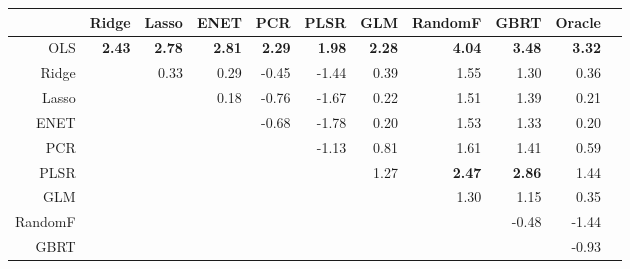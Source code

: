 \documentclass{article}
\begin{document}
\begin{table}[ht]
\centering
\begin{tabular}{rrrrrrrrrrr}
  \hline
& Ridge & Lasso & ENET & PCR & PLSR & GLM & RandomF & GBRT & Oracle \\ 
  \hline
OLS & \textbf{2.43} & \textbf{2.78} & \textbf{2.81} & \textbf{2.29} & \textbf{1.98} & \textbf{2.28} & \textbf{4.04} & \textbf{3.48} & \textbf{3.32} \\ 
  Ridge  && 0.33 & 0.29 & -0.45 & -1.44 & 0.39 & 1.55 & 1.30 & 0.36 \\ 
  Lasso  &&& 0.18 & -0.76 & -1.67 & 0.22 & 1.51 & 1.39 & 0.21 \\ 
  ENET  &&&& -0.68 & -1.78 & 0.20 & 1.53 & 1.33 & 0.20 \\ 
  PCR  &&&&& -1.13 & 0.81 & 1.61 & 1.41 & 0.59 \\ 
  PLSR  &&&&&& 1.27 & \textbf{2.47} & \textbf{2.86} & 1.44 \\ 
  GLM  &&&&&&& 1.30 & 1.15 & 0.35 \\ 
  RandomF &&&&&&&& -0.48 & -1.44 \\ 
  GBRT  &&&&&&&&& -0.93 \\ 
   \hline
\end{tabular}
\end{table}
\end{document}
